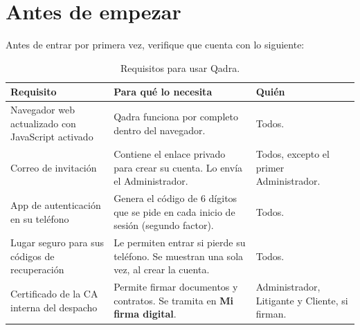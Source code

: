 \chapter{Antes de empezar}\label{cap:requisitos}

Antes de entrar por primera vez, verifique que cuenta con lo siguiente:

\begin{table}[H]
  \centering
  \caption{Requisitos para usar Qadra.}\label{tab:requisitos}
  \begin{tabularx}{\textwidth}{L{4.2cm} Y L{3.2cm}}
    \toprule
    \textbf{Requisito} & \textbf{Para qué lo necesita} & \textbf{Quién} \\
    \midrule
    Navegador web actualizado con JavaScript activado
      & Qadra funciona por completo dentro del navegador.
      & Todos. \\
    Correo de invitación
      & Contiene el enlace privado para crear su cuenta. Lo envía el
        Administrador.
      & Todos, excepto el primer Administrador. \\
    App de autenticación en su teléfono
      & Genera el código de 6 dígitos que se pide en cada inicio de
        sesión (segundo factor).
      & Todos. \\
    Lugar seguro para sus códigos de recuperación
      & Le permiten entrar si pierde su teléfono. Se muestran una sola
        vez, al crear la cuenta.
      & Todos. \\
    Certificado de la CA interna del despacho
      & Permite firmar documentos y contratos. Se tramita en
        \textbf{Mi firma digital}.
      & Administrador, Litigante y Cliente, si firman. \\
    \bottomrule
  \end{tabularx}
\end{table}

